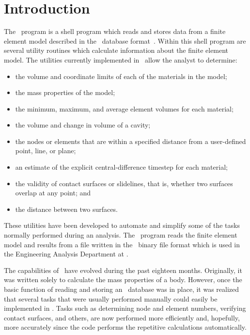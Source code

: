 \chapter{Introduction}

The \numbers\ program is a shell program which reads and stores data
from a finite element model described in the \exo\ database
format~\cite{EXODUS}.
Within this shell program are several utility routines which calculate
information about the finite element model.  The utilities currently
implemented in \numbers\ allow the analyst to determine: 
\begin{itemize}
\item the volume and coordinate limits of each of the materials in the model;
\item the mass properties of the model; 
\item the minimum, maximum, and average element volumes for each material; 
\item the volume and change in volume of a cavity; 
\item the nodes or elements that are within a specified distance from a
user-defined point, line, or plane; 
\item an estimate of the explicit central-difference timestep for each 
material; 
\item the validity of contact surfaces or slidelines, that is, whether
two surfaces overlap at any point; and
\item the distance between two surfaces.
\end{itemize}

These utilities have been developed to automate and simplify some of the
tasks normally performed during an analysis.  The \numbers\ program
reads the finite element model and results from a file written in the
\exo\ binary file format which is used in the Engineering
Analysis Department at \SNLA. 

The capabilities of \numbers\ have evolved during the past eighteen
months.  Originally, it was written solely to calculate the mass
properties of a body.  However, once the basic function of reading and
storing an \exo\ database was in place, it was realized that several
tasks that were usually performed manually could easily be implemented
in \numbers.  Tasks such as determining node and element numbers,
verifying contact surfaces, and others, are now performed more
efficiently and, hopefully, more accurately since the code performs the
repetitive calculations automatically. 

